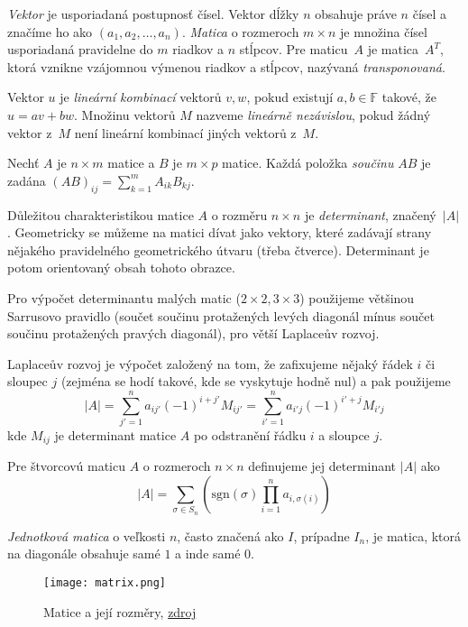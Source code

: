 {\em Vektor} je usporiadaná postupnosť čísel. Vektor dĺžky $n$ obsahuje práve $n$ čísel
a značíme ho ako $(a_1, a_2, \ldots, a_n)$. {\em Matica} o rozmeroch $m \times n$ je množina čísel
usporiadaná pravidelne do $m$ riadkov a $n$ stĺpcov. Pre maticu~$A$ je 
matica~$A^T$, ktorá vznikne vzájomnou výmenou riadkov a stĺpcov,
nazývaná {\em transponovaná}.

Vektor $u$ je {\em lineární kombinací} vektorů $v, w$, pokud existují
$a,b \in \mathbb{F}$ takové, že $u = av + bw$.
Množinu vektorů $M$ nazveme {\em lineárně nezávislou}, pokud žádný
vektor z~$M$ není lineární kombinací jiných vektorů z~$M$.

\begin{definition}
    Nechť $A$ je $n \times m$ matice a $B$ je $m \times p$ matice.
    Každá položka {\em součinu} $AB$ je zadána
    $(AB)_{ij} = \sum^{m}_{k = 1} A_{ik} B_{kj}$.
\end{definition}


Důležitou charakteristikou matice $A$ o rozměru $n \times n$ je {\em
determinant}, značený~$\lvert A \rvert$. Geometricky se můžeme na matici
dívat jako vektory, které zadávají strany nějakého pravidelného
geometrického útvaru (třeba čtverce). Determinant je potom orientovaný
obsah tohoto obrazce.

Pro výpočet determinantu malých matic ($2\times2,
3\times3$) použijeme většinou Sarrusovo pravidlo (součet součinu
protažených levých diagonál mínus součet součinu protažených pravých
diagonál), pro větší
Laplaceův rozvoj.

Laplaceův rozvoj je výpočet založený na tom, že zafixujeme nějaký řádek
$i$ či sloupec $j$ (zejména se hodí takové, kde se vyskytuje hodně nul)
a pak použijeme
\[
    \lvert A \rvert
    = \sum_{j' = 1}^{n} a_{ij'} (-1)^{i + j'} M_{ij'}
    = \sum_{i' = 1}^{n} a_{i'j} (-1)^{i' + j} M_{i'j}
\]
kde $M_{ij}$ je determinant matice $A$ po odstranění řádku $i$ a sloupce
$j$.

\begin{definition}
	Pre štvorcovú maticu $A$ o rozmeroch $n \times n$ definujeme jej determinant $|A|$ ako
	\[
		|A|= \sum_{\sigma \in S_n} \left(\text{sgn}(\sigma) \prod_{i=1}^n a_{i, \sigma(i)} \right)
	\]
\end{definition}

{\em Jednotková matica} o veľkosti $n$, často značená ako $I$, prípadne $I_n$,
je matica, ktorá na diagonále obsahuje samé $1$ a inde samé $0$.

\begin{figure}[h]
    \centering
    \texttt{[image: matrix.png]}
    \caption{Matice a její rozměry, \href{https://commons.wikimedia.org/wiki/File:Matrix.svg}{zdroj}}
\end{figure}

